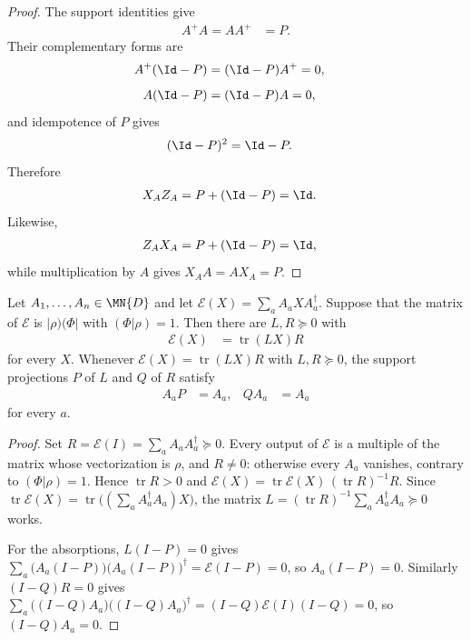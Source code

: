 \begin{proof}\leanok
    The support identities give
    \begin{align}
        A^+A=AA^+ & =P.
    \end{align}
    Their complementary forms are
    \begin{align}
        A^+(\Id-P)=(\Id-P)A^+ & =0,
    \end{align}
    \begin{align}
        A(\Id-P)=(\Id-P)A & =0,
    \end{align}
    and idempotence of $P$ gives
    \begin{align}
        (\Id-P)^2 & =\Id-P.
    \end{align}
    Therefore
    \begin{align}
        X_AZ_A & =P+(\Id-P)=\Id.
    \end{align}
    Likewise,
    \begin{align}
        Z_AX_A & =P+(\Id-P)=\Id,
    \end{align}
    while multiplication by $A$ gives $X_AA=AX_A=P$.
\end{proof}

\begin{lemma}
    \label{lem:mpu_rank_one_transfer_trace_pair}
    \leanok
    Let $A_1,\dots,A_n\in\MN{D}$ and let $\mathcal E(X)=\sum_aA_aXA_a^\dagger$.
    Suppose that the matrix of $\mathcal E$ is $|\rho)(\Phi|$ with
    $(\Phi|\rho)=1$. Then there are $L,R\succeq0$ with
    \begin{align}
        \mathcal E(X) & =\operatorname{tr}(LX)R
    \end{align}
    for every $X$. Whenever $\mathcal E(X)=\operatorname{tr}(LX)R$ with
    $L,R\succeq0$, the support projections $P$ of $L$ and $Q$ of $R$ satisfy
    \begin{align}
        A_aP & =A_a, & QA_a & =A_a
    \end{align}
    for every $a$.
\end{lemma}

\begin{proof}\leanok
    Set $R=\mathcal E(I)=\sum_aA_aA_a^\dagger\succeq0$. Every output of
    $\mathcal E$ is a multiple of the matrix whose vectorization is $\rho$, and
    $R\neq0$: otherwise every $A_a$ vanishes, contrary to $(\Phi|\rho)=1$.
    Hence $\operatorname{tr}R>0$ and
    $\mathcal E(X)=\operatorname{tr}\mathcal E(X)\,(\operatorname{tr}R)^{-1}R$.
    Since $\operatorname{tr}\mathcal E(X)=\operatorname{tr}\bigl(
        (\sum_aA_a^\dagger A_a)X\bigr)$, the matrix
    $L=(\operatorname{tr}R)^{-1}\sum_aA_a^\dagger A_a\succeq0$ works.

    For the absorptions, $L(I-P)=0$ gives
    $\sum_a\bigl(A_a(I-P)\bigr)\bigl(A_a(I-P)\bigr)^\dagger
        =\mathcal E(I-P)=0$, so $A_a(I-P)=0$. Similarly $(I-Q)R=0$ gives
    $\sum_a\bigl((I-Q)A_a\bigr)\bigl((I-Q)A_a\bigr)^\dagger
        =(I-Q)\mathcal E(I)(I-Q)=0$, so $(I-Q)A_a=0$.
\end{proof}

